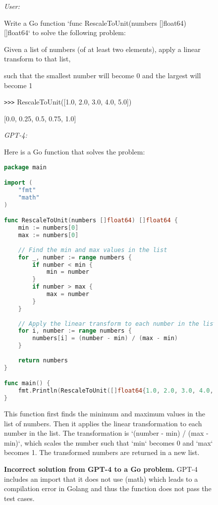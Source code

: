 \begin{figure}[htbp]
\hrulefill

\emph{User:}

\hrulefill

Write a Go function `func RescaleToUnit(numbers []float64) []float64` to solve the following problem:

Given a list of numbers (of at least two elements), apply a linear transform to that list,

such that the smallest number will become 0 and the largest will become 1

\verb|>>>| RescaleToUnit([1.0, 2.0, 3.0, 4.0, 5.0])

[0.0, 0.25, 0.5, 0.75, 1.0]

\hrulefill

\emph{GPT-4:}

\hrulefill

Here is a Go function that solves the problem:
\begin{lstlisting}[language=Go,breaklines=true]
package main

import (
    "fmt"
    "math"
)

func RescaleToUnit(numbers []float64) []float64 {
    min := numbers[0]
    max := numbers[0]
    
    // Find the min and max values in the list
    for _, number := range numbers {
        if number < min {
            min = number
        }
        if number > max {
            max = number
        }
    }
    
    // Apply the linear transform to each number in the list
    for i, number := range numbers {
        numbers[i] = (number - min) / (max - min)
    }
    
    return numbers
}

func main() {
    fmt.Println(RescaleToUnit([]float64{1.0, 2.0, 3.0, 4.0, 5.0}))
}
\end{lstlisting}
This function first finds the minimum and maximum values in the list of numbers. Then it applies the linear transformation to each number in the list. The transformation is `(number - min) / (max - min)`, which scales the number such that `min` becomes 0 and `max` becomes 1. The transformed numbers are returned in a new list.

\hrulefill
\caption{\textbf{Incorrect solution from GPT-4 to a \evals{} Go problem.} GPT-4 includes an import that it does not use (math) which leads to a compilation error in Golang and thus the function does not pass the test cases.}
\label{fig:gpt4go}
\end{figure}


